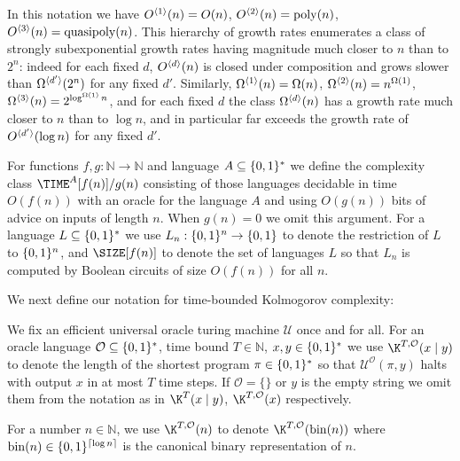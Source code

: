 In this notation we have $O^{\langle 1 \rangle}(n) = O(n)$, $O^{\langle 2 \rangle}(n) = \mathrm{poly}(n)$, $O^{\langle 3 \rangle}(n) = \mathrm{quasipoly}(n)$. This hierarchy of growth rates enumerates a class of strongly subexponential growth rates having magnitude much closer to $n$ than to $2^n$: indeed for each fixed $d$, $O^{\langle d \rangle}(n)$ is closed under composition and grows slower than $\Omega^{\langle d' \rangle}(2^n)$ for any fixed $d'$.
Similarly, $\Omega^{\langle 1 \rangle}(n) = \Omega(n)$, $\Omega^{\langle 2 \rangle}(n) = n^{\Omega(1)}$, $\Omega^{\langle 3 \rangle}(n) = 2^{\log^{\Omega(1)}n}$, and for each fixed $d$ the class $\Omega^{\langle d \rangle}(n)$ has a growth rate much closer to $n$ than to $\log n$, and in particular far exceeds the growth rate of $O^{\langle d' \rangle}(\log n)$ for any fixed $d'$.



\begin{definition}
For functions $f,g:\mathbb{N} \to \mathbb{N}$ and language $A \subseteq \{0,1\}^*$ we define the complexity class $\TIME^A[f(n)]/g(n)$ consisting of those languages decidable in time $O(f(n))$ with an oracle for the language $A$ and using $O(g(n))$ bits of advice on inputs of length $n$. When $g(n)=0$ we omit this argument.
For a language $L \subseteq \{0,1\}^*$ we use $L_n: \{0,1\}^n \to \{0,1\}$ to denote the restriction of $L$ to $\{0,1\}^n$, and $\SIZE[f(n)]$ to denote the set of languages $L$ so that $L_n$ is computed by Boolean circuits of size $O(f(n))$ for all $n$.
\end{definition}

We next define our notation for time-bounded Kolmogorov complexity:

\begin{definition}
We fix an efficient universal oracle turing machine $\mathcal{U}$ once and for all. For an oracle language $\mathcal{O} \subseteq \{0,1\}^*$, time bound $T\in \mathbb{N}$, $x,y \in \{0,1\}^*$ we use $\K^{T,\mathcal{O}}(x \mid y)$ to denote the length of the shortest program $\pi \in \{0,1\}^*$ so that $\mathcal{U}^\mathcal{O}(\pi,y)$ halts with output $x$ in at most $T$ time steps. If $\mathcal{O} = \{\}$ or $y$ is the empty string we omit them from the notation as in $\K^{T}(x \mid y)$, $\K^{T,\mathcal{O}}(x)$ respectively.

For a number $n \in \mathbb{N}$, we use $\K^{T,\mathcal{O}}(n)$ to denote $\K^{T,\mathcal{O}}(\mathrm{bin}(n))$ where $\mathrm{bin}(n) \in \{0,1\}^{\lceil \log n \rceil}$ is the canonical binary representation of $n$. 
\end{definition}

